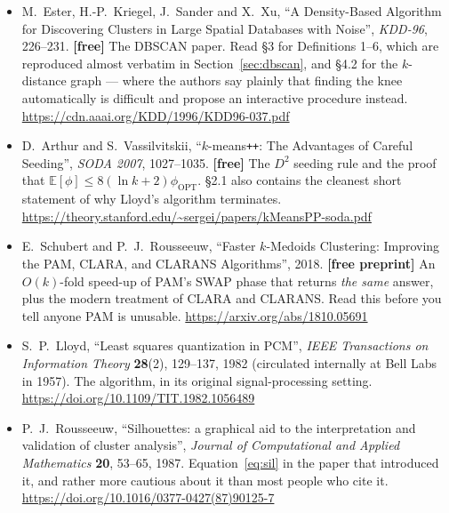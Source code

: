 \documentclass[11pt]{article}
\begin{document}
\begin{itemize}[leftmargin=*]
  \item M.\ Ester, H.-P.\ Kriegel, J.\ Sander and X.\ Xu, ``A Density-Based
    Algorithm for Discovering Clusters in Large Spatial Databases with
    Noise'', \emph{KDD-96}, 226--231. \textbf{[free]} The DBSCAN paper. Read
    \S3 for Definitions 1--6, which are reproduced almost verbatim in
    Section~\ref{sec:dbscan}, and \S4.2 for the $k$-distance graph --- where
    the authors say plainly that finding the knee automatically is difficult
    and propose an interactive procedure instead.
    \url{https://cdn.aaai.org/KDD/1996/KDD96-037.pdf}
  \item D.\ Arthur and S.\ Vassilvitskii, ``$k$-means\texttt{++}: The
    Advantages of Careful Seeding'', \emph{SODA 2007}, 1027--1035.
    \textbf{[free]} The $D^2$ seeding rule and the proof that
    $\mathbb{E}[\phi] \le 8(\ln k + 2)\phi_{\text{OPT}}$. \S2.1 also contains
    the cleanest short statement of why Lloyd's algorithm terminates.
    \url{https://theory.stanford.edu/~sergei/papers/kMeansPP-soda.pdf}
  \item E.\ Schubert and P.\ J.\ Rousseeuw, ``Faster $k$-Medoids Clustering:
    Improving the PAM, CLARA, and CLARANS Algorithms'', 2018.
    \textbf{[free preprint]} An $O(k)$-fold speed-up of PAM's SWAP phase that
    returns \emph{the same} answer, plus the modern treatment of CLARA and
    CLARANS. Read this before you tell anyone PAM is unusable.
    \url{https://arxiv.org/abs/1810.05691}
  \item S.\ P.\ Lloyd, ``Least squares quantization in PCM'', \emph{IEEE
    Transactions on Information Theory} \textbf{28}(2), 129--137, 1982
    (circulated internally at Bell Labs in 1957). The algorithm, in its
    original signal-processing setting.
    \url{https://doi.org/10.1109/TIT.1982.1056489}
  \item P.\ J.\ Rousseeuw, ``Silhouettes: a graphical aid to the
    interpretation and validation of cluster analysis'', \emph{Journal of
    Computational and Applied Mathematics} \textbf{20}, 53--65, 1987.
    Equation~\eqref{eq:sil} in the paper that introduced it, and rather more
    cautious about it than most people who cite it.
    \url{https://doi.org/10.1016/0377-0427(87)90125-7}
\end{itemize}

\notesources{\AMLUnitVIISources}
\end{document}
